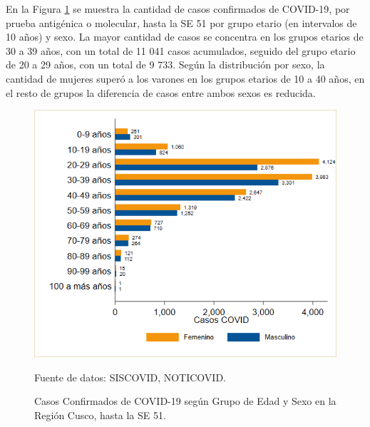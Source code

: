 \documentclass[12pt,a4paper,openany]{book}
\begin{document}
 	\noindent En la Figura \ref{fig:casos_edad_sexo} se muestra la cantidad de casos confirmados de COVID-19, por prueba antigénica o molecular, hasta la SE 51 por grupo etario (en intervalos de 10 años) y sexo. La mayor cantidad de casos se concentra en los grupos etarios de 30 a 39 años, con un total de 11 041 casos acumulados, seguido del grupo etario de 20 a 29 años, con un total de 9 733. Según la distribución por sexo, la cantidad de mujeres superó a los varones en los grupos etarios de 10 a 40 años, en el resto de grupos la diferencia de casos entre ambos sexos es reducida.  
 	
 	
 	
	\begin{figure}[h]
		\caption{Casos Confirmados de COVID-19 según Grupo de Edad y Sexo en la Región Cusco, hasta la SE 51.}\label{fig:casos_edad_sexo}
		\begin{center}
			\includegraphics[width=0.75\linewidth]{../figuras/casos_etapavida_2022}
		\end{center}
		{\footnotesize {Fuente de datos: SISCOVID, NOTICOVID.}}
	\end{figure}
\pagebreak
\end{document}
